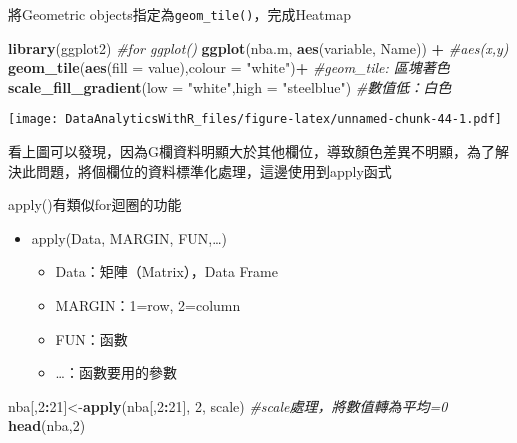 \documentclass[
]{book}
\newenvironment{Shaded}{\begin{snugshade}}{\end{snugshade}}
\newcommand{\CommentTok}[1]{\textcolor[rgb]{0.56,0.35,0.01}{\textit{#1}}}
\newcommand{\DataTypeTok}[1]{\textcolor[rgb]{0.13,0.29,0.53}{#1}}
\newcommand{\DecValTok}[1]{\textcolor[rgb]{0.00,0.00,0.81}{#1}}
\newcommand{\KeywordTok}[1]{\textcolor[rgb]{0.13,0.29,0.53}{\textbf{#1}}}
\newcommand{\NormalTok}[1]{#1}
\newcommand{\OperatorTok}[1]{\textcolor[rgb]{0.81,0.36,0.00}{\textbf{#1}}}
\newcommand{\StringTok}[1]{\textcolor[rgb]{0.31,0.60,0.02}{#1}}
\providecommand{\tightlist}{%
  \setlength{\itemsep}{0pt}\setlength{\parskip}{0pt}}
\begin{document}
將Geometric objects指定為\texttt{geom\_tile()}，完成Heatmap

\begin{Shaded}
\begin{Highlighting}[]
\KeywordTok{library}\NormalTok{(ggplot2) }\CommentTok{#for ggplot()}
\KeywordTok{ggplot}\NormalTok{(nba.m, }\KeywordTok{aes}\NormalTok{(variable, Name)) }\OperatorTok{+}\StringTok{ }\CommentTok{#aes(x,y)}
\StringTok{    }\KeywordTok{geom_tile}\NormalTok{(}\KeywordTok{aes}\NormalTok{(}\DataTypeTok{fill =}\NormalTok{ value),}\DataTypeTok{colour =} \StringTok{"white"}\NormalTok{)}\OperatorTok{+}\StringTok{ }\CommentTok{#geom_tile: 區塊著色}
\StringTok{    }\KeywordTok{scale_fill_gradient}\NormalTok{(}\DataTypeTok{low =} \StringTok{"white"}\NormalTok{,}\DataTypeTok{high =} \StringTok{"steelblue"}\NormalTok{) }\CommentTok{#數值低：白色}
\end{Highlighting}
\end{Shaded}

\texttt{[image: DataAnalyticsWithR\_files/figure-latex/unnamed-chunk-44-1.pdf]}

看上圖可以發現，因為G欄資料明顯大於其他欄位，導致顏色差異不明顯，為了解決此問題，將個欄位的資料標準化處理，這邊使用到apply函式

apply()有類似for迴圈的功能

\begin{itemize}
\tightlist
\item
  apply(Data, MARGIN, FUN,\ldots)

  \begin{itemize}
  \tightlist
  \item
    Data：矩陣（Matrix），Data Frame
  \item
    MARGIN：1=row, 2=column
  \item
    FUN：函數
  \item
    \ldots：函數要用的參數
  \end{itemize}
\end{itemize}

\begin{Shaded}
\begin{Highlighting}[]
\NormalTok{nba[,}\DecValTok{2}\OperatorTok{:}\DecValTok{21}\NormalTok{]<-}\KeywordTok{apply}\NormalTok{(nba[,}\DecValTok{2}\OperatorTok{:}\DecValTok{21}\NormalTok{], }\DecValTok{2}\NormalTok{, scale) }\CommentTok{#scale處理，將數值轉為平均=0}
\KeywordTok{head}\NormalTok{(nba,}\DecValTok{2}\NormalTok{)}
\end{Highlighting}
\end{Shaded}
\end{document}
